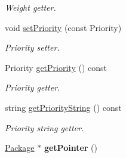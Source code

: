 \begin{DoxyCompactItemize}
\begin{DoxyCompactList}\small\item\em Weight getter. \end{DoxyCompactList}\item 
void \hyperlink{classPackage_afe16b4fbff0a050019ddf47978001464}{set\+Priority} (const Priority)
\begin{DoxyCompactList}\small\item\em Priority setter. \end{DoxyCompactList}\item 
Priority \hyperlink{classPackage_a89dc6064fa77412299f1076056e6128a}{get\+Priority} () const 
\begin{DoxyCompactList}\small\item\em Priority getter. \end{DoxyCompactList}\item 
string \hyperlink{classPackage_aaf5a625d7851e24dd18bae23309c03d7}{get\+Priority\+String} () const 
\begin{DoxyCompactList}\small\item\em Priority string getter. \end{DoxyCompactList}\item 
\hyperlink{classPackage}{Package} $\ast$ {\bfseries get\+Pointer} ()\hypertarget{classPackage_a77c9ac0d3d435ce001757fe9f7ffdd98}{}\label{classPackage_a77c9ac0d3d435ce001757fe9f7ffdd98}

\end{DoxyCompactItemize}
